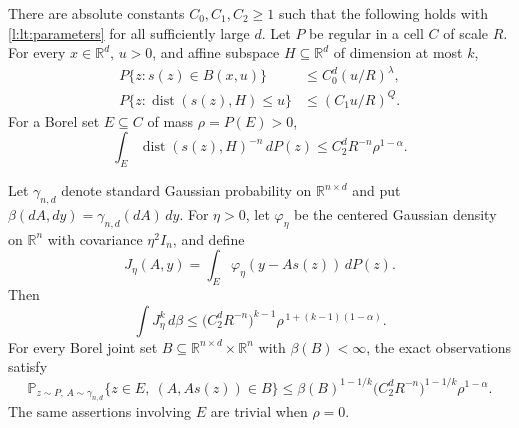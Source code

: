 \begin{lemma}
\label{lem:l-lt-projection}
There are absolute constants $C_0,C_1,C_2\ge1$ such that the following
holds with \eqref{l:lt:parameters} for all sufficiently large $d$.
Let $P$ be regular in a cell $C$ of scale $R$.  For every
$x\in\mathbb R^d$, $u>0$, and affine subspace $H\subseteq\mathbb R^d$
of dimension at most $k$,
\begin{align}
 P\{z:s(z)\in B(x,u)\}
 &\le C_0^d(u/R)^\lambda, \label{l:lt:ball}\\
 P\{z:\operatorname{dist}(s(z),H)\le u\}
 &\le(C_1u/R)^Q. \label{l:lt:tube}
\end{align}
For a Borel set $E\subseteq C$ of mass $\rho=P(E)>0$,
\begin{equation}\label{l:lt:inverse}
 \int_E\operatorname{dist}(s(z),H)^{-n}\,dP(z)
 \le C_2^dR^{-n}\rho^{1-\alpha}.
\end{equation}

Let $\gamma_{n,d}$ denote standard Gaussian probability on
$\mathbb R^{n\times d}$ and put
$\beta(dA,dy)=\gamma_{n,d}(dA)\,dy$.  For $\eta>0$, let
$\varphi_\eta$ be the centered Gaussian density on $\mathbb R^n$ with
covariance $\eta^2I_n$, and define
\[
 J_\eta(A,y)=\int_E\varphi_\eta(y-As(z))\,dP(z).
\]
Then
\begin{equation}\label{l:lt:moment}
 \int J_\eta^k\,d\beta
 \le \bigl(C_2^dR^{-n}\bigr)^{k-1}
       \rho^{\,1+(k-1)(1-\alpha)}.
\end{equation}
For every Borel joint set $B\subseteq
\mathbb R^{n\times d}\times\mathbb R^n$ with $\beta(B)<\infty$,
the exact observations satisfy
\begin{equation}\label{l:lt:exact-set}
 \mathbb P_{z\sim P,\,A\sim\gamma_{n,d}}
       \{z\in E,\ (A,As(z))\in B\}
 \le \beta(B)^{1-1/k}
       \bigl(C_2^dR^{-n}\bigr)^{1-1/k}\rho^{1-\alpha}.
\end{equation}
The same assertions involving $E$ are trivial when $\rho=0$.
\end{lemma}
